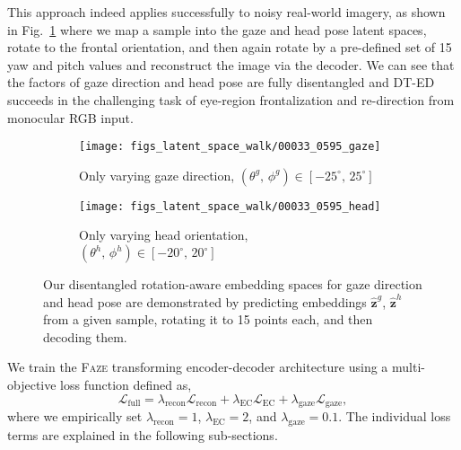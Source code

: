 \documentclass[10pt,twocolumn,letterpaper]{article}
\newcommand{\faze}[0]{\textsc{Faze}\xspace}
\begin{document}
This approach indeed applies successfully to noisy real-world imagery, as shown in Fig.~\ref{fig:latent_walks} where we map a sample into the gaze and head pose latent spaces, rotate to the frontal orientation, and then again rotate by a pre-defined set of 15 yaw and pitch values and reconstruct the image via the decoder. We can see that the factors of gaze direction and head pose are fully disentangled
and DT-ED succeeds in the challenging task of eye-region frontalization and re-direction from monocular RGB input.


\begin{figure}[t]
    \centering
    \begin{subfigure}[t]{\columnwidth}
        \texttt{[image: figs\_latent\_space\_walk/00033\_0595\_gaze]} 
        \vskip -1.8mm
        \caption{\small Only varying gaze direction, $\left(\theta^g,\,\phi^g\right)\in[-25^\circ,\,25^\circ]$}
    \end{subfigure}
    \begin{subfigure}[t]{\columnwidth}
        \texttt{[image: figs\_latent\_space\_walk/00033\_0595\_head]}
        \vskip -1.8mm
        \caption{\small Only varying head orientation, $\left(\theta^h,\,\phi^h\right)\in[-20^\circ,\,20^\circ]$}
    \end{subfigure}
    \vskip -2.2mm
    \caption{Our disentangled rotation-aware embedding spaces for gaze direction and head pose are demonstrated by predicting embeddings $\hat{\mathbf{z}}^g$, $\hat{\mathbf{z}}^h$ from a given sample, rotating it to 15 points each, and then decoding them. 
    \label{fig:latent_walks}
    }
    \vspace*{-5mm}
\end{figure}

We train the \faze transforming encoder-decoder architecture using a multi-objective loss function defined as,
\begin{equation}
\label{eq:loss}
    \mathcal{L}_\mathrm{full} = 
    \lambda_\mathrm{recon} \mathcal{L}_\mathrm{recon}
    + \lambda_\mathrm{EC} \mathcal{L}_\mathrm{EC}
    + \lambda_\mathrm{gaze} \mathcal{L}_\mathrm{gaze},
\end{equation}
where we empirically set $\lambda_\mathrm{recon}=1$, $\lambda_\mathrm{EC}=2$, and $\lambda_\mathrm{gaze}=0.1$.
The individual loss terms are explained in the following sub-sections.
\end{document}
